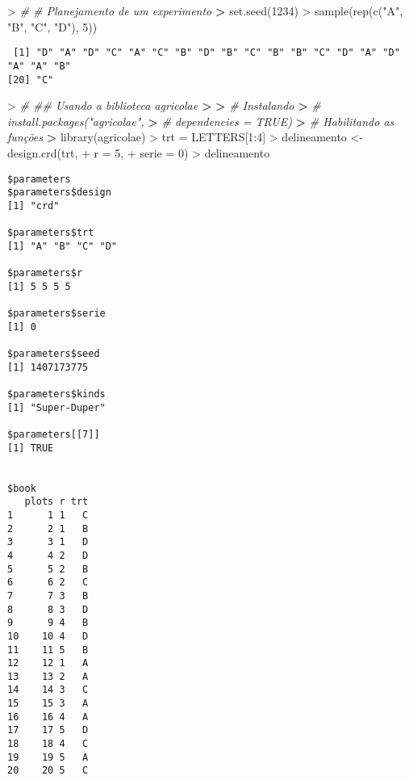 \documentclass[
]{book}
\newenvironment{Shaded}{\begin{snugshade}}{\end{snugshade}}
\newcommand{\AttributeTok}[1]{\textcolor[rgb]{0.77,0.63,0.00}{#1}}
\newcommand{\CommentTok}[1]{\textcolor[rgb]{0.56,0.35,0.01}{\textit{#1}}}
\newcommand{\DecValTok}[1]{\textcolor[rgb]{0.00,0.00,0.81}{#1}}
\newcommand{\ErrorTok}[1]{\textcolor[rgb]{0.64,0.00,0.00}{\textbf{#1}}}
\newcommand{\FunctionTok}[1]{\textcolor[rgb]{0.00,0.00,0.00}{#1}}
\newcommand{\NormalTok}[1]{#1}
\newcommand{\OtherTok}[1]{\textcolor[rgb]{0.56,0.35,0.01}{#1}}
\newcommand{\SpecialCharTok}[1]{\textcolor[rgb]{0.00,0.00,0.00}{#1}}
\newcommand{\StringTok}[1]{\textcolor[rgb]{0.31,0.60,0.02}{#1}}
\begin{document}
\begin{Shaded}
\begin{Highlighting}[]
\SpecialCharTok{\textgreater{}} \CommentTok{\#\textquotesingle{} \# Planejamento de um experimento}
\ErrorTok{\textgreater{}} \FunctionTok{set.seed}\NormalTok{(}\DecValTok{1234}\NormalTok{)}
\SpecialCharTok{\textgreater{}} \FunctionTok{sample}\NormalTok{(}\FunctionTok{rep}\NormalTok{(}\FunctionTok{c}\NormalTok{(}\StringTok{"A"}\NormalTok{, }\StringTok{"B"}\NormalTok{, }\StringTok{"C"}\NormalTok{, }\StringTok{"D"}\NormalTok{), }\DecValTok{5}\NormalTok{))}
\end{Highlighting}
\end{Shaded}

\begin{verbatim}
 [1] "D" "A" "D" "C" "A" "C" "B" "D" "B" "C" "B" "B" "C" "D" "A" "D" "A" "A" "B"
[20] "C"
\end{verbatim}

\begin{Shaded}
\begin{Highlighting}[]
\SpecialCharTok{\textgreater{}} \CommentTok{\#\textquotesingle{} \#\# Usando a biblioteca agricolae}
\ErrorTok{\textgreater{}} 
\ErrorTok{\textgreater{}} \CommentTok{\# Instalando}
\ErrorTok{\textgreater{}} \CommentTok{\# install.packages("agricolae", }
\ErrorTok{\textgreater{}} \CommentTok{\#                  dependencies = TRUE)}
\ErrorTok{\textgreater{}} \CommentTok{\# Habilitando as funções}
\ErrorTok{\textgreater{}} \FunctionTok{library}\NormalTok{(agricolae)}
\SpecialCharTok{\textgreater{}}\NormalTok{ trt }\OtherTok{=}\NormalTok{ LETTERS[}\DecValTok{1}\SpecialCharTok{:}\DecValTok{4}\NormalTok{]}
\SpecialCharTok{\textgreater{}}\NormalTok{ delineamento }\OtherTok{\textless{}{-}} \FunctionTok{design.crd}\NormalTok{(trt,}
\SpecialCharTok{+}                            \AttributeTok{r =} \DecValTok{5}\NormalTok{,}
\SpecialCharTok{+}                            \AttributeTok{serie =} \DecValTok{0}\NormalTok{)}
\SpecialCharTok{\textgreater{}}\NormalTok{ delineamento}
\end{Highlighting}
\end{Shaded}

\begin{verbatim}
$parameters
$parameters$design
[1] "crd"

$parameters$trt
[1] "A" "B" "C" "D"

$parameters$r
[1] 5 5 5 5

$parameters$serie
[1] 0

$parameters$seed
[1] 1407173775

$parameters$kinds
[1] "Super-Duper"

$parameters[[7]]
[1] TRUE


$book
   plots r trt
1      1 1   C
2      2 1   B
3      3 1   D
4      4 2   D
5      5 2   B
6      6 2   C
7      7 3   B
8      8 3   D
9      9 4   B
10    10 4   D
11    11 5   B
12    12 1   A
13    13 2   A
14    14 3   C
15    15 3   A
16    16 4   A
17    17 5   D
18    18 4   C
19    19 5   A
20    20 5   C
\end{verbatim}
\end{document}
